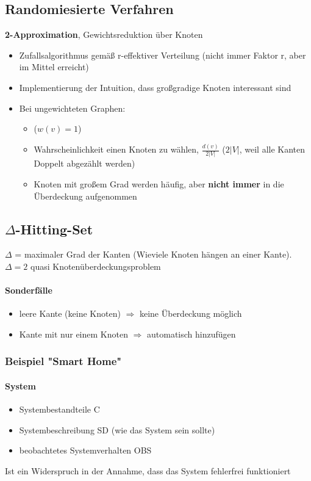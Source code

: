 \documentclass[ngerman]{scrartcl}
\begin{document}
\subsection{Randomiesierte Verfahren}
\textbf{2-Approximation}, Gewichtsreduktion über Knoten
\begin{itemize}
  \item Zufallsalgorithmus gemäß r-effektiver Verteilung (nicht immer Faktor r, aber im Mittel erreicht)
  \item Implementierung der Intuition, dass großgradige Knoten interessant sind
  \item Bei ungewichteten Graphen:
  \begin{itemize}
    \item ($ w(v) = 1 $)
    \item Wahrscheinlichkeit einen Knoten zu wählen, $ \frac{d(v)}{2|V|} $ ($ 2|V| $, weil alle Kanten Doppelt abgezählt werden)
    \item Knoten mit großem Grad werden häufig, aber \textbf{nicht immer} in die Überdeckung aufgenommen
  \end{itemize}
\end{itemize}

\subsection{$\Delta$-Hitting-Set}
$\Delta$ = maximaler Grad der Kanten (Wieviele Knoten hängen an einer Kante). $ \Delta = 2 $ quasi Knotenüberdeckungsproblem
\paragraph{Sonderfälle}
\begin{itemize}
  \item leere Kante (keine Knoten) $ \Rightarrow $ keine Überdeckung möglich
  \item Kante mit nur einem Knoten $ \Rightarrow $ automatisch hinzufügen
\end{itemize}
\subsubsection{Beispiel "Smart Home"}
\paragraph{System}
\begin{itemize}
  \item Systembestandteile C
  \item Systembeschreibung SD (wie das System sein sollte)
  \item beobachtetes Systemverhalten OBS
\end{itemize}
Ist ein Widerspruch in der Annahme, dass das System fehlerfrei funktioniert 
\end{document}
